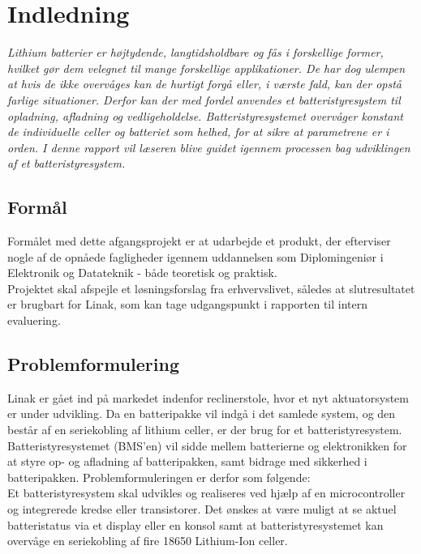 \chapter{Indledning}

\emph{Lithium batterier er højtydende, langtidsholdbare og fås i forskellige former, hvilket gør dem velegnet til mange forskellige applikationer. De har dog ulempen at hvis de ikke overvåges kan de hurtigt forgå eller, i værste fald, kan der opstå farlige situationer. Derfor kan der med fordel anvendes et batteristyresystem til opladning, afladning og vedligeholdelse. Batteristyresystemet overvåger konstant de individuelle celler og batteriet som helhed, for at sikre at parametrene er i orden. I denne rapport vil læseren blive guidet igennem processen bag udviklingen af et batteristyresystem.}

\section{Formål}
Formålet med dette afgangsprojekt er at udarbejde et produkt, der efterviser nogle af de opnåede fagligheder igennem uddannelsen som Diplomingeniør i Elektronik og Datateknik - både teoretisk og praktisk.
\\

Projektet skal afspejle et løsningsforslag fra erhvervslivet, således at slutresultatet er brugbart for Linak, som kan tage udgangspunkt i rapporten til intern evaluering. 

\section{Problemformulering}
Linak er gået ind på markedet indenfor reclinerstole, hvor et nyt aktuatorsystem er under udvikling. Da en batteripakke vil indgå i det samlede system, og den består af en seriekobling af lithium celler, er der brug for et batteristyresystem. Batteristyresystemet (BMS’en) vil sidde mellem batterierne og elektronikken for at styre op- og afladning af batteripakken, samt bidrage med sikkerhed i batteripakken. Problemformuleringen er derfor som følgende:
\\

Et batteristyresystem skal udvikles og realiseres ved hjælp af en microcontroller og integrerede kredse eller transistorer. Det ønskes at være muligt at se aktuel batteristatus via et display eller en konsol samt at batteristyresystemet kan overvåge en seriekobling af fire 18650 Lithium-Ion celler.
\\

